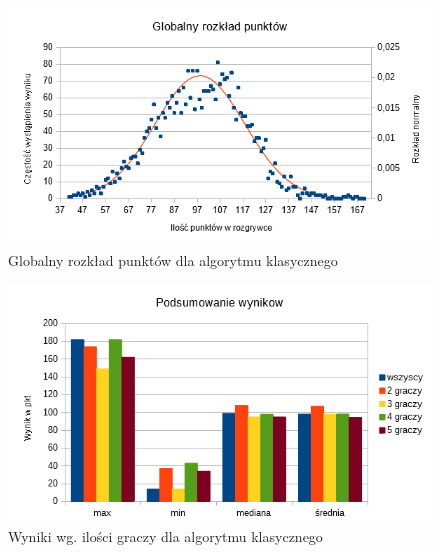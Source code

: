 \documentclass[12pt, oneside]{report}
\begin{document}
	\begin{figure}
		\includegraphics[height=0.45\textheight,width=\textwidth]{GaussWykrespunktowglobal.png}
		\caption{Globalny rozkład punktów dla algorytmu klasycznego}
		\label{figure:global_points_algo}
	\end{figure}
	
	\begin{figure}
		\includegraphics[height=0.45\textheight,width=\textwidth]{WynikWPkt.png}
		\caption{Wyniki wg. ilości graczy dla algorytmu klasycznego}
		\label{figure:min_max_algo}
	\end{figure}
\end{document}
